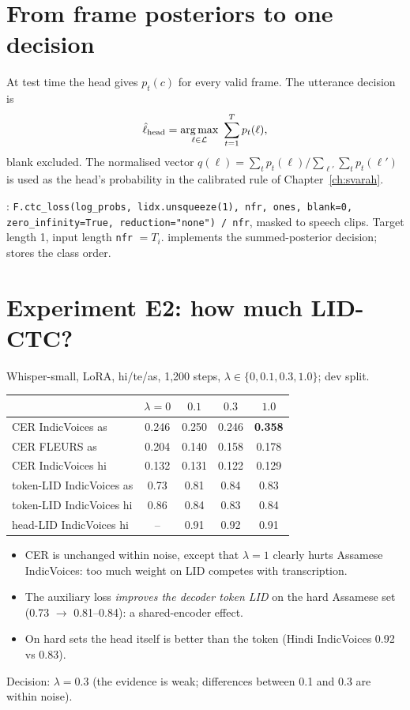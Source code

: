 \section{From frame posteriors to one decision}

At test time the head gives $p_t(c)$ for every valid frame. The utterance decision is
\[
\hat\ell_{\text{head}}=\operatorname*{arg\,max}_{\ell\in\mathcal L}\ \sum_{t=1}^{T}p_t(\ell),
\]
blank excluded. The normalised vector $q(\ell)=\sum_tp_t(\ell)\big/\sum_{\ell'}\sum_tp_t(\ell')$ is used as the head's
probability in the calibrated rule of Chapter~\ref{ch:svarah}.

\begin{incode}
: \texttt{F.ctc\_loss(log\_probs, lidx.unsqueeze(1), nfr, ones, blank=0, zero\_infinity=True,
reduction="none") / nfr}, masked to speech clips. Target length 1, input length \texttt{nfr} $=T_i$. 
implements the summed-posterior decision;  stores the class order.
\end{incode}

\section{Experiment E2: how much LID-CTC?}

Whisper-small, LoRA, hi/te/as, 1{,}200 steps, $\lambda\in\{0,0.1,0.3,1.0\}$; dev split.

\begin{center}
\small
\begin{tabular}{lcccc}
\toprule
 & $\lambda=0$ & $0.1$ & $\mathbf{0.3}$ & $1.0$\\
\midrule
CER IndicVoices as & 0.246 & 0.250 & 0.246 & \textbf{0.358}\\
CER FLEURS as & 0.204 & 0.140 & 0.158 & 0.178\\
CER IndicVoices hi & 0.132 & 0.131 & 0.122 & 0.129\\
token-LID IndicVoices as & 0.73 & 0.81 & 0.84 & 0.83\\
token-LID IndicVoices hi & 0.86 & 0.84 & 0.83 & 0.84\\
head-LID IndicVoices hi & -- & 0.91 & 0.92 & 0.91\\
\bottomrule
\end{tabular}
\end{center}

\begin{itemize}
\item CER is unchanged within noise, except that $\lambda=1$ clearly hurts Assamese IndicVoices: too much weight on LID competes
with transcription.
\item The auxiliary loss \emph{improves the decoder token LID} on the hard Assamese set (0.73 $\to$ 0.81--0.84): a shared-encoder
effect.
\item On hard sets the head itself is better than the token (Hindi IndicVoices 0.92 vs 0.83).
\end{itemize}
Decision: $\lambda=0.3$ (the evidence is weak; differences between 0.1 and 0.3 are within noise).


